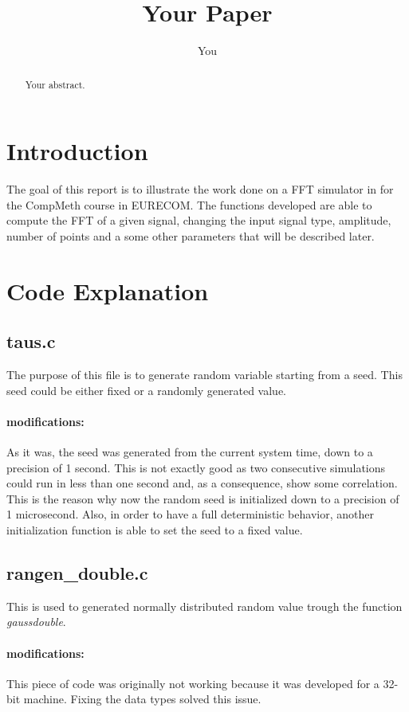 \documentclass[a4paper]{article}
\title{Your Paper}
\author{You}
\begin{document}
\maketitle

\begin{abstract}
    Your abstract.
\end{abstract}

\section{Introduction}

The goal of this report is to illustrate the work done on a FFT simulator in for the CompMeth course in EURECOM.
The functions developed are able to compute the FFT of a given signal, changing the input signal type, amplitude, number of points and a some other parameters that will be described later.

\section{Code Explanation}
\subsection{taus.c}
The purpose of this file is to generate random variable starting from a seed. This seed could be either fixed or a randomly generated value.
\paragraph{modifications:}
As it was, the seed was generated from the current system time, down to a precision of 1 second. This is not exactly good as two consecutive simulations could run in less than one second and, as a consequence, show some correlation. This is the reason why now the random seed is initialized down to a precision of 1 microsecond.
Also, in order to have a full deterministic behavior, another initialization function is able to set the seed to a fixed value.

\subsection{rangen\_double.c}
This is used to generated normally distributed random value trough the function \textit{gaussdouble}.
\paragraph{modifications:}
This piece of code was originally not working because it was developed for a 32-bit machine. Fixing the data types solved this issue.
\end{document}
